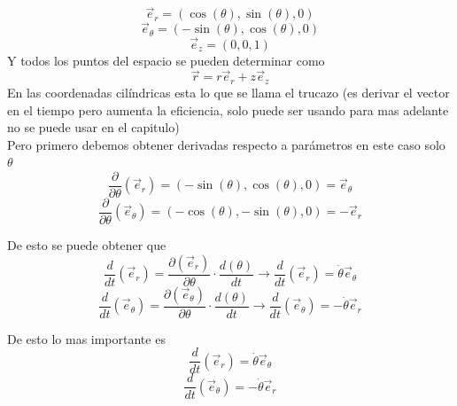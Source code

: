 $$\Vec{e}_r=(\cos(\theta),\sin(\theta),0)$$
$$\Vec{e}_{\theta}=(-\sin(\theta),\cos(\theta),0)$$
$$\Vec{e}_z=(0,0,1)$$
Y todos los puntos del espacio se pueden determinar como
$$\Vec{r}=r\Vec{e}_r+z\Vec{e}_z$$
\ifMostrarTruco
En las coordenadas cilíndricas esta lo que se llama el trucazo (es derivar el vector en el tiempo pero aumenta la eficiencia, solo puede ser usando para mas adelante no se puede usar en el capitulo)\\
Pero primero debemos obtener derivadas respecto a parámetros en este caso solo $\theta$
$$\dfrac{\partial}{\partial\theta}(\Vec{e}_r)=(-\sin(\theta),\cos(\theta),0)=\Vec{e}_{\theta}$$
$$\dfrac{\partial}{\partial\theta}(\Vec{e}_{\theta})=(-\cos(\theta),-\sin(\theta),0)=-\Vec{e}_r$$

De esto se puede obtener que
$$\dfrac{d}{dt}(\Vec{e}_r)=\dfrac{\partial(\Vec{e}_r)}{\partial\theta}\cdot\dfrac{d(\theta)}{dt}\longrightarrow\dfrac{d}{dt}(\Vec{e}_r)=\dot{\theta}\Vec{e}_{\theta}$$
$$\dfrac{d}{dt}(\Vec{e}_{\theta})=\dfrac{\partial(\Vec{e}_{\theta})}{\partial\theta}\cdot\dfrac{d(\theta)}{dt}\longrightarrow\dfrac{d}{dt}(\Vec{e}_{\theta})=-\dot{\theta}\Vec{e}_r$$

De esto lo mas importante es 
$$\dfrac{d}{dt}(\Vec{e}_r)=\dot{\theta}\Vec{e}_{\theta}$$
$$\dfrac{d}{dt}(\Vec{e}_{\theta})=-\dot{\theta}\Vec{e}_r$$
\fi
